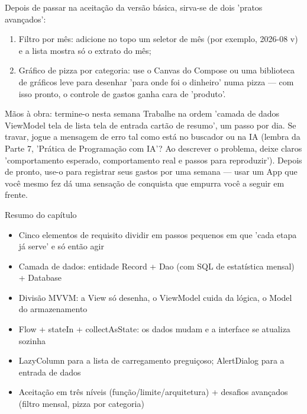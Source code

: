 Depois de passar na aceitação da versão básica, sirva-se de dois 'pratos avançados':

\begin{enumerate}
  \item Filtro por mês: adicione no topo um seletor de mês (por exemplo, 2026-08 v) e a lista mostra só o extrato do mês;
  \item Gráfico de pizza por categoria: use o Canvas do Compose ou uma biblioteca de gráficos leve para desenhar 'para onde foi o dinheiro' numa pizza — com isso pronto, o controle de gastos ganha cara de 'produto'.
\end{enumerate}

\begin{tcbpractice}{Mãos à obra: termine-o nesta semana}
Trabalhe na ordem 'camada de dados ViewModel tela de lista tela de entrada cartão de resumo', um passo por dia. Se travar, jogue a mensagem de erro tal como está no buscador ou na IA (lembra da Parte 7, 'Prática de Programação com IA'? Ao descrever o problema, deixe claros 'comportamento esperado, comportamento real e passos para reproduzir'). Depois de pronto, use-o para registrar seus gastos por uma semana — usar um App que você mesmo fez dá uma sensação de conquista que empurra você a seguir em frente.

\end{tcbpractice}

\begin{tcbsummary}{Resumo do capítulo}
\begin{itemize}
  \item Cinco elementos de requisito dividir em passos pequenos em que 'cada etapa já serve' e só então agir
  \item Camada de dados: entidade Record + Dao (com SQL de estatística mensal) + Database
  \item Divisão MVVM: a View só desenha, o ViewModel cuida da lógica, o Model do armazenamento
  \item Flow + stateIn + collectAsState: os dados mudam e a interface se atualiza sozinha
  \item LazyColumn para a lista de carregamento preguiçoso; AlertDialog para a entrada de dados
  \item Aceitação em três níveis (função/limite/arquitetura) + desafios avançados (filtro mensal, pizza por categoria)
\end{itemize}

\end{tcbsummary}
